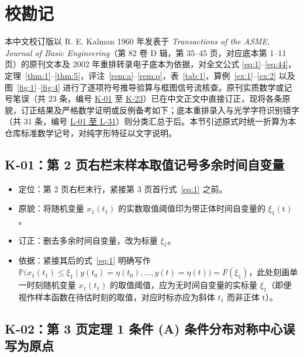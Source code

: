 \section{校勘记}\label{sec:errata}

本中文校订版以 R. E. Kalman 1960 年发表于 \emph{Transactions of the ASME, Journal of Basic Engineering}（第 82 卷 D 辑，第 35–45 页，对应底本第 1–11 页）的原刊文本及 2002 年重排转录电子底本为依据，对全文公式 \eqref{eq:1}–\eqref{eq:44}，定理~\ref{thm:1}–\ref{thm:5}，评注~\ref{rem:a}–\ref{rem:q}，表~\ref{tab:1}，算例~\ref{ex:1}–\ref{ex:2} 以及图~\ref{fig:1}–\ref{fig:4} 进行了逐项符号推导验算与框图信号流核查。原刊实质数学或记号笔误（共 23 条，编号 \hyperref[sec:k01]{K-01} 至 \hyperref[sec:k23]{K-23}）已在中文正文中直接订正，现将各条原貌，订正结果及严格数学证明或反例备考如下；底本重排录入与光学字符识别错字（共 31 条，编号 \hyperref[sec:l-all]{L-01 至 L-31}）则分类汇总于后。本节引述原式时统一折算为本仓库标准数学记号，对纯字形特征以文字说明。

\subsection{K-01：第 2 页右栏末样本取值记号多余时间自变量}\label{sec:k01}

\begin{itemize}
\item 定位：第 2 页右栏末行，紧接第 3 页首行式~\eqref{eq:1} 之前。
\item 原貌：将随机变量 $x_1(t_1)$ 的实数取值阈值印为带正体时间自变量的 $\xi_1(\mathrm{t})$。
\item 订正：删去多余时间自变量，改为标量 $\xi_1$。
\item 依据：紧接其后的式~\eqref{eq:1} 明确写作 $\mathbb{P}\bigl(x_1(t_1) \leq \xi_1 \mid y(t_0) = \eta(t_0), \dots, y(t) = \eta(t)\bigr) = F(\xi_1)$，此处刻画单一时刻随机变量 $x_1(t_1)$ 的取值阈值，应为无时间自变量的实标量 $\xi_1$（即便视作样本函数在待估时刻的取值，对应时标亦应为斜体 $t_1$ 而非正体 $\mathrm{t}$）。
\end{itemize}

\subsection{K-02：第 3 页定理 1 条件 (A) 条件分布对称中心误写为原点}\label{sec:k02}

